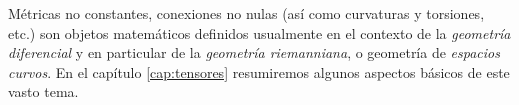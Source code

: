 Métricas no constantes, conexiones no nulas (así como curvaturas y torsiones, etc.) son objetos matemáticos definidos usualmente en el contexto de la \textit{geometría diferencial} y en particular de la \textit{geometría riemanniana}, o geometría de \textit{espacios curvos}. En el capítulo \ref{cap:tensores} resumiremos algunos aspectos básicos de este vasto tema.

%
%
%
